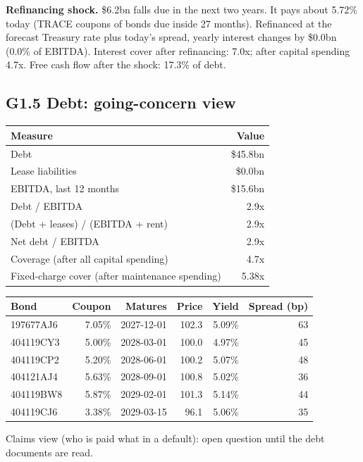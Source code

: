 \documentclass[11pt,a4paper]{article}
\begin{document}
\textbf{Refinancing shock.} \$6.2bn falls due in the next two years. It pays about 5.72\% today (TRACE coupons of bonds due inside 27 months). Refinanced at the forecast Treasury rate plus today's spread, yearly interest changes by \$0.0bn (0.0\% of EBITDA). Interest cover after refinancing: 7.0x; after capital spending 4.7x. Free cash flow after the shock: 17.3\% of debt.
\subsection*{G1.5 Debt: going-concern view}
\begin{center}\footnotesize\setlength{\tabcolsep}{3.5pt}\begin{tabular}{@{}lr@{}}\toprule
Measure & Value \\\midrule
Debt & \$45.8bn \\
Lease liabilities & \$0.0bn \\
EBITDA, last 12 months & \$15.6bn \\
Debt / EBITDA & 2.9x \\
(Debt + leases) / (EBITDA + rent) & 2.9x \\
Net debt / EBITDA & 2.9x \\
Coverage (after all capital spending) & 4.7x \\
Fixed-charge cover (after maintenance spending) & 5.38x \\
\bottomrule\end{tabular}\end{center}
\begin{center}\footnotesize\setlength{\tabcolsep}{3.5pt}\begin{tabular}{@{}lrrrrr@{}}\toprule
Bond & Coupon & Matures & Price & Yield & Spread (bp) \\\midrule
197677AJ6 & 7.05\% & 2027-12-01 & 102.3 & 5.09\% & 63 \\
404119CY3 & 5.00\% & 2028-03-01 & 100.0 & 4.97\% & 45 \\
404119CP2 & 5.20\% & 2028-06-01 & 100.2 & 5.07\% & 48 \\
404121AJ4 & 5.63\% & 2028-09-01 & 100.8 & 5.02\% & 36 \\
404119BW8 & 5.87\% & 2029-02-01 & 101.3 & 5.14\% & 44 \\
404119CJ6 & 3.38\% & 2029-03-15 & 96.1 & 5.06\% & 35 \\
\bottomrule\end{tabular}\end{center}
Claims view (who is paid what in a default): open question until the debt documents are read.
\end{document}
